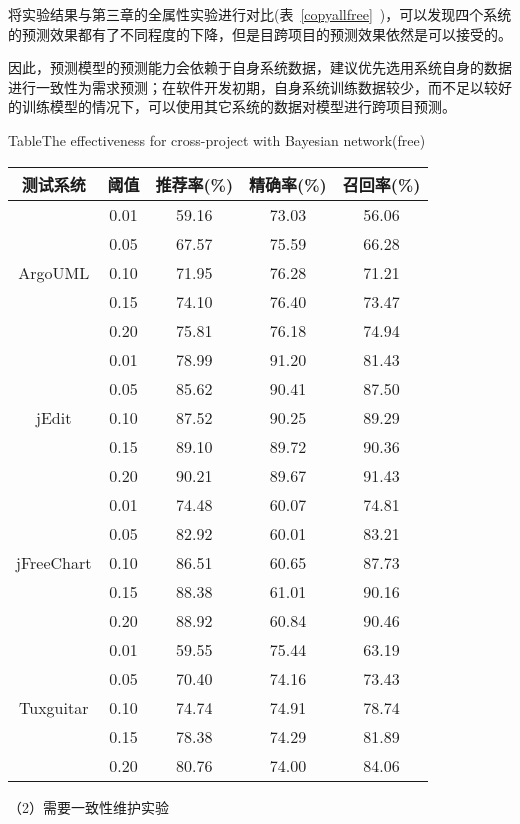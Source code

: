 将实验结果与第三章的全属性实验进行对比(表~\ref{copyallfree}~)，可以发现四个系统的预测效果都有了不同程度的下降，但是目跨项目的预测效果依然是可以接受的。

因此，预测模型的预测能力会依赖于自身系统数据，建议优先选用系统自身的数据进行一致性为需求预测；在软件开发初期，自身系统训练数据较少，而不足以较好的训练模型的情况下，可以使用其它系统的数据对模型进行跨项目预测。

\begin{table}[htbp]
{Table$\!$}{The effectiveness for cross-project with Bayesian network(free)}
\vspace{0.5em}
\centering
\wuhao
\begin{tabular}{ccccc}
\toprule[1.5pt]
{测试系统}&{阈值}&{推荐率(\%)}&{精确率(\%)}&{召回率(\%)}\\
\midrule[1pt]
\multirow{5}{*}{ArgoUML}
&0.01&	59.16&	73.03&	56.06\\
&0.05&	67.57&	75.59&	66.28\\
&0.10&	71.95&	76.28&	71.21\\
&0.15&	74.10&	76.40&	73.47\\
&0.20&	75.81&	76.18&	74.94\\
\hline
\multirow{5}{*}{jEdit}
&0.01&	78.99&	91.20&	81.43\\
&0.05&	85.62&	90.41&	87.50\\
&0.10&	87.52&	90.25&	89.29\\
&0.15&	89.10&	89.72&	90.36\\
&0.20&	90.21&	89.67&	91.43\\
\hline
\multirow{5}{*}{jFreeChart}
&0.01&	74.48&	60.07&	74.81\\
&0.05&	82.92&	60.01&	83.21\\
&0.10&	86.51&	60.65&	87.73\\
&0.15&	88.38&	61.01&	90.16\\
&0.20&	88.92&	60.84&	90.46\\
\hline
\multirow{5}{*}{Tuxguitar}
&0.01&	59.55&	75.44&	63.19\\
&0.05&	70.40&	74.16&	73.43\\
&0.10&	74.74&	74.91&	78.74\\
&0.15&	78.38&	74.29&	81.89\\
&0.20&	80.76&	74.00&	84.06\\
\bottomrule[1.5pt]
\end{tabular}
\end{table}

（2）需要一致性维护实验

